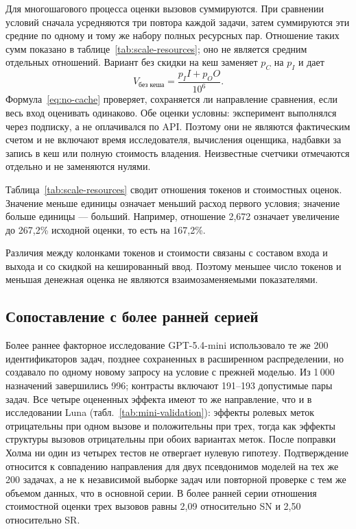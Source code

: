 Для многошагового процесса оценки вызовов суммируются. При сравнении условий сначала усредняются три повтора каждой задачи, затем суммируются эти средние по одному и тому же набору полных ресурсных пар. Отношение таких сумм показано в таблице~\ref{tab:scale-resources}; оно не является средним отдельных отношений. Вариант без скидки на кеш заменяет $p_C$ на $p_I$ и дает
\begin{equation}
V_{\text{без кеша}}=\frac{p_I I+p_O O}{10^6}.
\label{eq:no-cache}
\end{equation}
Формула~\eqref{eq:no-cache} проверяет, сохраняется ли направление сравнения, если весь вход оценивать одинаково. Обе оценки условны: эксперимент выполнялся через подписку, а не оплачивался по API. Поэтому они не являются фактическим счетом и не включают время исследователя, вычисления оценщика, надбавки за запись в кеш или полную стоимость владения. Неизвестные счетчики отмечаются отдельно и не заменяются нулями.

Таблица~\ref{tab:scale-resources} сводит отношения токенов и стоимостных оценок. Значение меньше единицы означает меньший расход первого условия; значение больше единицы --- больший. Например, отношение 2,672 означает увеличение до 267,2\% исходной оценки, то есть на 167,2\%.

Различия между колонками токенов и стоимости связаны с составом входа и выхода и со скидкой на кешированный ввод. Поэтому меньшее число токенов и меньшая денежная оценка не являются взаимозаменяемыми показателями.

\subsection{Сопоставление с более ранней серией}
Более раннее факторное исследование GPT-5.4-mini использовало те же 200 идентификаторов задач, позднее сохраненных в расширенном распределении, но создавало по одному новому запросу на условие с прежней моделью. Из 1\,000 назначений завершились 996; контрасты включают 191--193 допустимые пары задач. Все четыре оцененных эффекта имеют то же направление, что и в исследовании Luna (табл.~\ref{tab:mini-validation}): эффекты ролевых меток отрицательны при одном вызове и положительны при трех, тогда как эффекты структуры вызовов отрицательны при обоих вариантах меток. После поправки Холма ни один из четырех тестов не отвергает нулевую гипотезу. Подтверждение относится к совпадению направления для двух псевдонимов моделей на тех же 200 задачах, а не к независимой выборке задач или повторной проверке с тем же объемом данных, что в основной серии. В более ранней серии отношения стоимостной оценки трех вызовов равны 2,09 относительно SN и 2,50 относительно SR.

